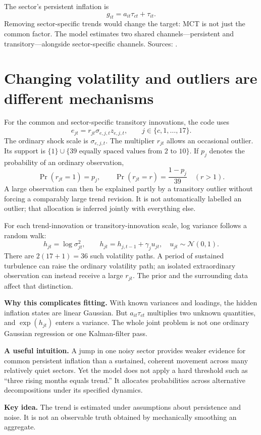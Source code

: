 \documentclass[11pt,a4paper]{article}
\newcommand{\N}{\mathcal N}
\newcommand{\takeaway}[1]{\par\medskip\noindent\colorbox{pale}{\parbox{\dimexpr\linewidth-2\fboxsep}{\textbf{Key idea.} #1}}\par\medskip}
\begin{document}
The sector's persistent inflation is
\[g_{it}=a_{it}\tau_{ct}+\tau_{it}.\]
Removing sector-specific trends would change the target: MCT is not just the common factor. The model estimates two shared channels---persistent and transitory---alongside sector-specific channels. Sources: \cite{nyfed,code}.

\newpage
\section{Changing volatility and outliers are different mechanisms}
For the common and sector-specific transitory innovations, the code uses
\[
e_{jt}=r_{jt}\sigma_{e,j,t}z_{e,j,t},\qquad j\in\{c,1,\ldots,17\}.
\]
The ordinary shock scale is $\sigma_{e,j,t}$. The multiplier $r_{jt}$ allows an occasional outlier. Its support is $\{1\}\cup\{39\text{ equally spaced values from }2\text{ to }10\}$. If $p_j$ denotes the probability of an ordinary observation,
\[
\Pr(r_{jt}=1)=p_j,\qquad
\Pr(r_{jt}=r)=\frac{1-p_j}{39}\quad(r>1).
\]
A large observation can then be explained partly by a transitory outlier without forcing a comparably large trend revision. It is not automatically labelled an outlier; that allocation is inferred jointly with everything else.

For each trend-innovation or transitory-innovation scale, log variance follows a random walk:
\[
h_{jt}=\log\sigma_{jt}^2,\qquad
h_{jt}=h_{j,t-1}+\gamma_j u_{jt},\quad u_{jt}\sim\N(0,1).
\]
There are $2(17+1)=36$ such volatility paths. A period of sustained turbulence can raise the ordinary volatility path; an isolated extraordinary observation can instead receive a large $r_{jt}$. The prior and the surrounding data affect that distinction.

\textbf{Why this complicates fitting.} With known variances and loadings, the hidden inflation states are linear Gaussian. But $a_{it}\tau_{ct}$ multiplies two unknown quantities, and $\exp(h_{jt})$ enters a variance. The whole joint problem is not one ordinary Gaussian regression or one Kalman-filter pass.

\textbf{A useful intuition.} A jump in one noisy sector provides weaker evidence for common persistent inflation than a sustained, coherent movement across many relatively quiet sectors. Yet the model does not apply a hard threshold such as ``three rising months equals trend.'' It allocates probabilities across alternative decompositions under its specified dynamics.
\takeaway{The trend is estimated under assumptions about persistence and noise. It is not an observable truth obtained by mechanically smoothing an aggregate.}
\end{document}

